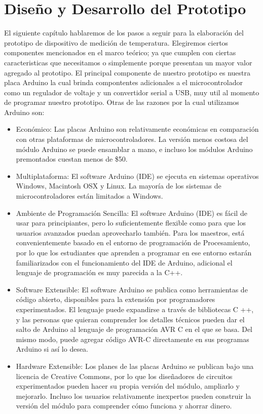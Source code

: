 \chapter{Diseño y Desarrollo del Prototipo}
\par 
El siguiente capítulo hablaremos de los pasos a seguir para la elaboración del prototipo de dispositivo de medición de temperatura. Elegiremos ciertos componentes mencionados en el marco teórico; ya que cumplen con ciertas caracteristicas que necesitamos o simplemente porque presentan un mayor valor agregado al prototipo. El principal componente de nuestro prototipo es nuestra placa Arduino la cual brinda compontentes adicionales a el microcontrolador como un regulador de voltaje y un convertidor serial a USB, muy util al momento de programar nuestro prototipo. Otras de las razones por la cual utilizamos Arduino son\cite{arduino-intro}:

\begin{itemize}
	\item Económico: 
	Las placas Arduino son relativamente económicas en comparación con otras plataformas de microcontroladores. La versión menos costosa del módulo Arduino se puede ensamblar a mano, e incluso los módulos Arduino premontados cuestan menos de \$50.
	
	\item Multiplataforma: El software Arduino (IDE) se ejecuta en sistemas operativos Windows, Macintosh OSX y Linux. La mayoría de los sistemas de microcontroladores están limitados a Windows.
	
	\item Ambiente de Programación Sencilla: El software Arduino (IDE) es fácil de usar para principiantes, pero lo suficientemente flexible como para que los usuarios avanzados puedan aprovecharlo también. Para los maestros, está convenientemente basado en el entorno de programación de Procesamiento, por lo que los estudiantes que aprenden a programar en ese entorno estarán familiarizados con el funcionamiento del IDE de Arduino, adicional el lenguaje de programación es muy parecida a la C++.
	
	\clearpage
	
	\item Software Extensible: El software Arduino se publica como herramientas de código abierto, disponibles para la extensión por programadores experimentados. El lenguaje puede expandirse a través de bibliotecas C ++, y las personas que quieran comprender los detalles técnicos pueden dar el salto de Arduino al lenguaje de programación AVR C en el que se basa. Del mismo modo, puede agregar código AVR-C directamente en sus programas Arduino si así lo desea.
	
	\item Hardware Extensible: 
	Los planes de las placas Arduino se publican bajo una licencia de Creative Commons, por lo que los diseñadores de circuitos experimentados pueden hacer su propia versión del módulo, ampliarlo y mejorarlo. Incluso los usuarios relativamente inexpertos pueden construir la versión del módulo para comprender cómo funciona y ahorrar dinero.
\end{itemize}

